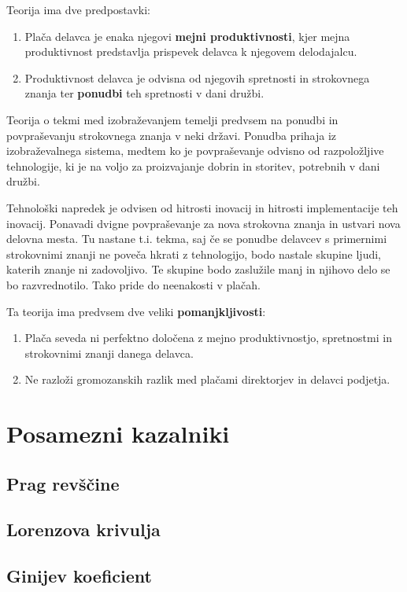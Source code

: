\documentclass[a4paper,12 pt]{article}
\begin{document}
Teorija ima dve predpostavki:
\begin{enumerate}
\item Plača delavca je enaka njegovi \textbf{mejni produktivnosti}, kjer mejna produktivnost predstavlja prispevek delavca k njegovem delodajalcu.
\item Produktivnost delavca je odvisna od njegovih spretnosti in strokovnega znanja ter \textbf{ponudbi} teh spretnosti v dani družbi.
\end{enumerate}

Teorija o tekmi med izobraževanjem temelji predvsem na ponudbi in povpraševanju strokovnega znanja v neki državi. Ponudba prihaja iz izobraževalnega sistema, medtem ko je povpraševanje odvisno od razpoložljive tehnologije, ki je na voljo za proizvajanje dobrin in storitev, potrebnih v dani družbi.

Tehnološki napredek je odvisen od hitrosti inovacij in hitrosti implementacije teh inovacij. Ponavadi dvigne povpraševanje za nova strokovna znanja in ustvari nova delovna mesta. Tu nastane t.i. tekma, saj če se ponudbe delavcev s primernimi strokovnimi znanji ne poveča hkrati z tehnologijo, bodo nastale skupine ljudi, katerih znanje ni zadovoljivo. Te skupine bodo zaslužile manj in njihovo delo se bo razvrednotilo. Tako pride do neenakosti v plačah.

Ta teorija ima predvsem dve veliki \textbf{pomanjkljivosti}:
\begin{enumerate}
\item Plača seveda ni perfektno določena z mejno produktivnostjo, spretnostmi in strokovnimi znanji danega delavca.
\item Ne razloži gromozanskih razlik med plačami direktorjev in delavci podjetja.
\end{enumerate}


\newpage

\section[Posamezni kazalniki]{Posamezni kazalniki}
\subsection[Prag revščine]{Prag revščine}
\subsection[Lorenzova krivulja]{Lorenzova krivulja}
\subsection[Ginijev koeficient]{Ginijev koeficient}
\end{document}
